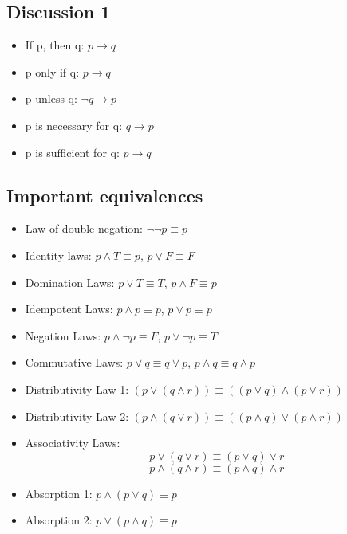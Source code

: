 \documentclass[8pt]{scrreprt}
\begin{document}
\begin{landscape}
\begin{multicols*}{3}
\subsection{Discussion 1}
\begin{itemize}
	\item If p, then q: $p\rightarrow q$
	\item p only if q: $p\rightarrow q$
	\item p unless q: $\neg q \rightarrow p$
	\item p is necessary for q: $q\rightarrow p$
	\item p is sufficient for q: $p\rightarrow q$
\end{itemize}

\subsection{Important equivalences}

\begin{itemize}
	\item Law of double negation: $\neg \neg p \equiv p$
	\item Identity laws: $p\land T \equiv p$, $p\lor F \equiv F$
	\item Domination Laws: $p\lor T \equiv T$, $p\land F \equiv p$
	\item Idempotent Laws: $p\land p \equiv p$, $p\lor p \equiv p$
	\item Negation Laws: $p\land \neg p\equiv F$, $p\lor \neg p \equiv T$
\end{itemize}

\begin{note}
	\begin{itemize}
		\item Commutative Laws: $p\lor q \equiv q\lor p$, $p\land q \equiv q\land p$
		\item Distributivity Law 1: $(p\lor (q\land r)) \equiv ((p\lor q)\land (p\lor r))$
		\item Distributivity Law 2: $(p\land (q\lor r)) \equiv ((p\land q)\lor (p\land r))$
		\item Associativity Laws: \[
			      p\lor (q\lor r) \equiv (p\lor q)\lor r \]
		      \[ p\land (q\land r)\equiv (p\land q)\land r \]
		\item Absorption 1: $p\land (p\lor q) \equiv p$
		\item Absorption 2: $p\lor (p\land q) \equiv p$
	\end{itemize}
\end{note}


\end{multicols*}
\end{landscape}
\end{document}
